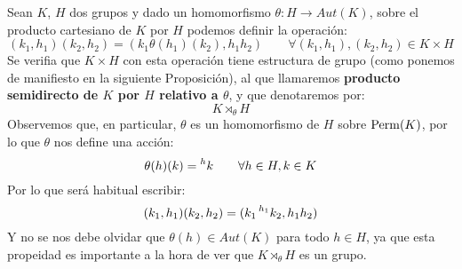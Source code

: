 \begin{definicion}
    Sean $K$, $H$ dos grupos y dado un homomorfismo $\theta:H\to Aut(K)$, sobre el producto cartesiano de $K$ por $H$ podemos definir la operación:
    \begin{equation*}
        (k_1,h_1)(k_2,h_2) = (k_1\theta(h_1)(k_2), h_1h_2) \qquad \forall (k_1,h_1),(k_2,h_2) \in K\times H
    \end{equation*}
    Se verifia que $K\times H$ con esta operación tiene estructura de grupo (como ponemos de manifiesto en la siguiente Proposición), al que llamaremos \textbf{producto semidirecto de $K$ por $H$ relativo a $\theta$}, y que denotaremos por:
    \begin{equation*}
        K\rtimes_\theta H
    \end{equation*}
    Observemos que, en particular, $\theta$ es un homomorfismo de $H$ sobre $\operatorname{Perm}(K)$, por lo que $\theta$ nos define una acción:
    \begin{equation*}
        \theta(h)(k) = \prescript{h}{}{k} \qquad \forall h\in H, k\in K
    \end{equation*}
    Por lo que será habitual escribir:
    \begin{equation*}
        (k_1,h_1)(k_2,h_2) = (k_1 \prescript{h_1}{}{k_2}, h_1h_2)
    \end{equation*}
    Y no se nos debe olvidar que $\theta(h) \in Aut(K)$ para todo $h\in H$, ya que esta propeidad es importante a la hora de ver que $K\rtimes_\theta H$ es un grupo.
\end{definicion}

